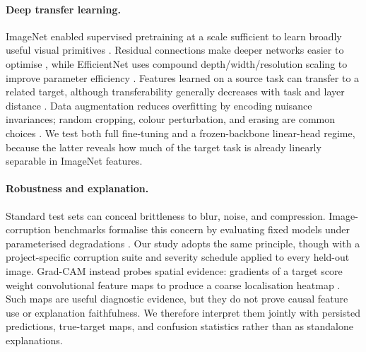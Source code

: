 \paragraph{Deep transfer learning.}
ImageNet enabled supervised pretraining at a scale sufficient to learn broadly
useful visual primitives \cite{deng2009imagenet}.  Residual connections make
deeper networks easier to optimise \cite{he2016deep}, while EfficientNet uses
compound depth/width/resolution scaling to improve parameter efficiency
\cite{tan2019efficientnet}.  Features learned on a source task can transfer to
a related target, although transferability generally decreases with task and
layer distance \cite{yosinski2014transferable}.  Data augmentation reduces
overfitting by encoding nuisance invariances; random cropping, colour
perturbation, and erasing are common choices
\cite{shorten2019survey,zhong2020random}.  We test both full fine-tuning and a
frozen-backbone linear-head regime, because the latter reveals how much of the
target task is already linearly separable in ImageNet features.

\paragraph{Robustness and explanation.}
Standard test sets can conceal brittleness to blur, noise, and compression.
Image-corruption benchmarks formalise this concern by evaluating fixed models
under parameterised degradations \cite{hendrycks2019benchmarking}.  Our study
adopts the same principle, though with a project-specific corruption suite and
severity schedule applied to every held-out image.  Grad-CAM instead probes
spatial evidence: gradients of a target score weight convolutional feature
maps to produce a coarse localisation heatmap \cite{selvaraju2017gradcam}.
Such maps are useful diagnostic evidence, but they do not prove causal feature
use or explanation faithfulness.  We therefore interpret them jointly with
persisted predictions, true-target maps, and confusion statistics rather than
as standalone explanations.
